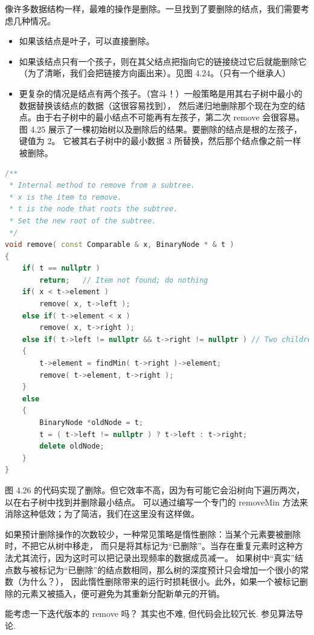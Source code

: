 \documentclass[a4paper]{ctexart}
\theoremstyle{definition}
\theoremstyle{definition}
\begin{document}
像许多数据结构一样，最难的操作是删除。一旦找到了要删除的结点，我们需要考虑几种情况。

\begin{itemize}
\item 如果该结点是叶子，可以直接删除。
\item 如果该结点只有一个孩子，则在其父结点把指向它的链接绕过它后就能删除它（为了清晰，我们会把链接方向画出来）。见图 4.24。（只有一个继承人）
\item 更复杂的情况是结点有两个孩子。（宫斗！）一般策略是用其右子树中最小的数据替换该结点的数据（这很容易找到），
然后递归地删除那个现在为空的结点。由于右子树中的最小结点不可能再有左孩子，第二次 remove 会很容易。
图 4.25 展示了一棵初始树以及删除后的结果。要删除的结点是根的左孩子，键值为 2。
它被其右子树中的最小数据 3 所替换，然后那个结点像之前一样被删除。
\end{itemize}

\begin{lstlisting}[language=C++]
/**
 * Internal method to remove from a subtree.
 * x is the item to remove.
 * t is the node that roots the subtree.
 * Set the new root of the subtree.
 */
void remove( const Comparable & x, BinaryNode * & t )
{
    if( t == nullptr )
        return;   // Item not found; do nothing
    if( x < t->element )
        remove( x, t->left );
    else if( t->element < x )
        remove( x, t->right );
    else if( t->left != nullptr && t->right != nullptr ) // Two children
    {
        t->element = findMin( t->right )->element;
        remove( t->element, t->right );
    }
    else
    {
        BinaryNode *oldNode = t;
        t = ( t->left != nullptr ) ? t->left : t->right;
        delete oldNode;
    }
}
\end{lstlisting}

图 4.26 的代码实现了删除。但它效率不高，因为有可能它会沿树向下遍历两次，以在右子树中找到并删除最小结点。
可以通过编写一个专门的 removeMin 方法来消除这种低效；为了简洁，我们在这里没有这样做。

如果预计删除操作的次数较少，一种常见策略是惰性删除：当某个元素要被删除时，不把它从树中移走，
而只是将其标记为“已删除”。当存在重复元素时这种方法尤其流行，因为这时可以把记录出现频率的数据成员减一。
如果树中“真实”结点数与被标记为“已删除”的结点数相同，那么树的深度预计只会增加一个很小的常数（为什么？），
因此惰性删除带来的运行时损耗很小。此外，如果一个被标记删除的元素又被插入，便可避免为其重新分配新单元的开销。

能考虑一下迭代版本的 remove 吗？ 其实也不难, 但代码会比较冗长. 参见算法导论.
\end{document}
